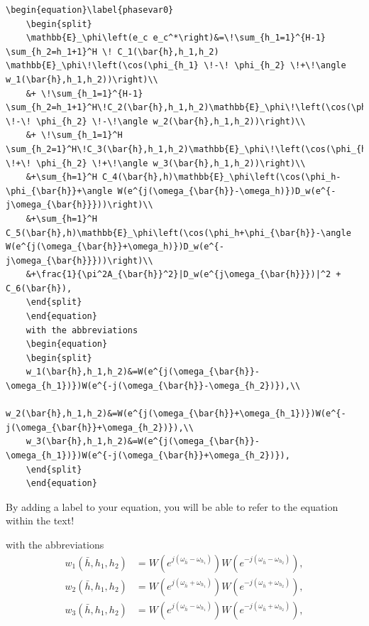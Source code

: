 \begin{mdframed}
	\begin{lstlisting}[language = Tex, caption={Add formulars to your text, splitted equations}, linewidth = 150mm]
	\begin{equation}\label{phasevar0}
	\begin{split}
	\mathbb{E}_\phi\left(e_c e_c^*\right)&=\!\sum_{h_1=1}^{H-1} \sum_{h_2=h_1+1}^H \! C_1(\bar{h},h_1,h_2) \mathbb{E}_\phi\!\left(\cos(\phi_{h_1} \!-\! \phi_{h_2} \!+\!\angle w_1(\bar{h},h_1,h_2))\right)\\
	&+ \!\sum_{h_1=1}^{H-1} \sum_{h_2=h_1+1}^H\!C_2(\bar{h},h_1,h_2)\mathbb{E}_\phi\!\left(\cos(\phi_{h_1} \!-\! \phi_{h_2} \!-\!\angle w_2(\bar{h},h_1,h_2))\right)\\
	&+ \!\sum_{h_1=1}^H \sum_{h_2=1}^H\!C_3(\bar{h},h_1,h_2)\mathbb{E}_\phi\!\left(\cos(\phi_{h_1} \!+\! \phi_{h_2} \!+\!\angle w_3(\bar{h},h_1,h_2))\right)\\
	&+\sum_{h=1}^H C_4(\bar{h},h)\mathbb{E}_\phi\left(\cos(\phi_h-\phi_{\bar{h}}+\angle W(e^{j(\omega_{\bar{h}}-\omega_h)})D_w(e^{-j\omega_{\bar{h}}}))\right)\\
	&+\sum_{h=1}^H C_5(\bar{h},h)\mathbb{E}_\phi\left(\cos(\phi_h+\phi_{\bar{h}}-\angle W(e^{j(\omega_{\bar{h}}+\omega_h)})D_w(e^{-j\omega_{\bar{h}}}))\right)\\
	&+\frac{1}{\pi^2A_{\bar{h}}^2}|D_w(e^{j\omega_{\bar{h}}})|^2 + C_6(\bar{h}),
	\end{split}
	\end{equation}
	with the abbreviations
	\begin{equation}
	\begin{split}
	w_1(\bar{h},h_1,h_2)&=W(e^{j(\omega_{\bar{h}}-\omega_{h_1})})W(e^{-j(\omega_{\bar{h}}-\omega_{h_2})}),\\
	w_2(\bar{h},h_1,h_2)&=W(e^{j(\omega_{\bar{h}}+\omega_{h_1})})W(e^{-j(\omega_{\bar{h}}+\omega_{h_2})}),\\
	w_3(\bar{h},h_1,h_2)&=W(e^{j(\omega_{\bar{h}}-\omega_{h_1})})W(e^{-j(\omega_{\bar{h}}+\omega_{h_2})}),
	\end{split}
	\end{equation}
	\end{lstlisting}
	By adding a label to your equation, you will be able to refer to the equation within the text!
\end{mdframed}
with the abbreviations
\begin{equation}
\begin{split}
w_1(\bar{h},h_1,h_2)&=W(e^{j(\omega_{\bar{h}}-\omega_{h_1})})W(e^{-j(\omega_{\bar{h}}-\omega_{h_2})}),\\
w_2(\bar{h},h_1,h_2)&=W(e^{j(\omega_{\bar{h}}+\omega_{h_1})})W(e^{-j(\omega_{\bar{h}}+\omega_{h_2})}),\\
w_3(\bar{h},h_1,h_2)&=W(e^{j(\omega_{\bar{h}}-\omega_{h_1})})W(e^{-j(\omega_{\bar{h}}+\omega_{h_2})}),
\end{split}
\end{equation}
